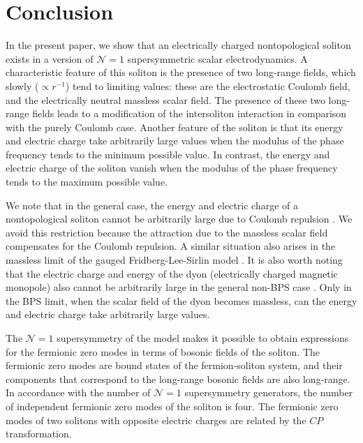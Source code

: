 \section{Conclusion}
\label{seq:VI}

In the present paper,  we  show  that  an  electrically  charged nontopological
soliton exists in a  version  of  $\mathcal{N}  =  1$   supersymmetric   scalar
electrodynamics.
A characteristic feature of  this  soliton is  the presence of  two  long-range
fields, which slowly ($ \propto r^{-1}$) tend to limiting values: these are the
electrostatic Coulomb  field,  and  the  electrically  neutral  massless scalar
field.
The presence of these  two  long-range  fields  leads  to a modification of the
intersoliton interaction in comparison with the purely Coulomb case.
Another feature of the soliton  is  that  its  energy  and electric charge take
arbitrarily large  values when  the modulus of the phase frequency tends to the
minimum possible value.
In contrast, the energy and electric  charge  of  the  soliton  vanish when the
modulus of the phase frequency tends to the maximum possible value.


We note that in   the   general   case,   the   energy and electric charge of a
nontopological soliton cannot  be  arbitrarily  large  due to Coulomb repulsion
\cite{klee, gulamov_2015}.
We avoid this restriction  because  the  attraction  due to the massless scalar
field compensates for the Coulomb repulsion.
A similar  situation  also  arises   in   the   massless  limit  of  the gauged
Fridberg-Lee-Sirlin model \cite{lshnir_2019, lshnir_2022}.
It is also worth  noting  that  the  electric  charge  and  energy  of the dyon
(electrically  charged  magnetic  monopole) also cannot be arbitrarily large in
the general non-BPS case \cite{bkt_1999}.
Only in the BPS limit, when the scalar  field of the dyon becomes massless, can
the energy and electric charge take arbitrarily large values.


The $\mathcal{N}=1$ supersymmetry of  the  model  makes  it  possible to obtain
expressions for the  fermionic  zero  modes  in  terms of bosonic fields of the
soliton.
The fermionic  zero  modes  are  bound  states  of  the fermion-soliton system,
and their components that correspond  to the long-range bosonic fields are also
long-range.
In accordance with the  number of $\mathcal{N}=1$ supersymmetry generators, the
number of independent fermionic zero modes of the soliton is four.
The fermionic zero modes of two  solitons  with  opposite  electric charges are
related by the $CP$ transformation.


